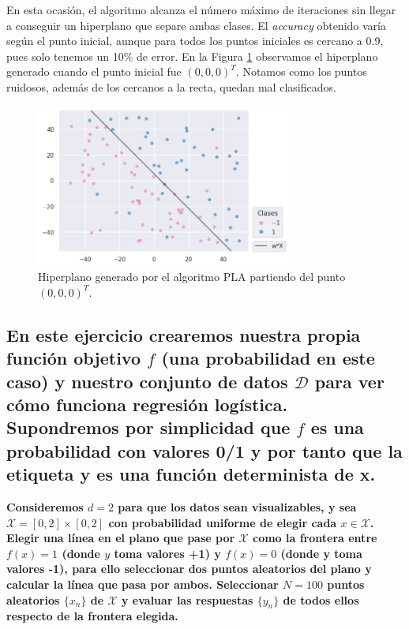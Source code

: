 \documentclass[a4paper, 20pt]{article}
\begin{document}
En esta ocasión, el algoritmo alcanza el número máximo de iteraciones sin llegar a conseguir un hiperplano que separe ambas clases. El \textit{accuracy} obtenido varía según el punto inicial, aunque para todos los puntos iniciales es cercano a 0.9, pues solo tenemos un 10\% de error. En la Figura \ref{fig:21ruido} observamos el hiperplano generado cuando el punto inicial fue $(0,0,0)^T$. Notamos como los puntos ruidosos, además de los cercanos a la recta, quedan mal clasificados. 

\begin{figure}[H]
    \centering
    \includegraphics[width=0.75\textwidth]{21ruido}
    \caption{Hiperplano generado por el algoritmo PLA partiendo del punto $(0,0,0)^T$.}
    \label{fig:21ruido}
\end{figure}

\subsection{En este ejercicio crearemos nuestra propia función objetivo $f$ (una probabilidad en este caso) y nuestro conjunto de datos $\mathcal{D}$ para ver cómo funciona regresión logística. Supondremos por simplicidad que $f$ es una probabilidad con valores 0/1 y por tanto que la etiqueta y es una función determinista de x.}

\textbf{Consideremos $d = 2$ para que los datos sean visualizables, y sea $\mathcal{X} = [0, 2] \times [0, 2]$ con probabilidad uniforme de elegir cada $x \in \mathcal{X}$. Elegir una línea en el plano que pase por $\mathcal{X}$ como la frontera entre $f (x) = 1$ (donde $y$ toma valores +1) y $f (x) = 0$ (donde y toma valores -1), para ello seleccionar dos puntos aleatorios del plano y calcular la línea que pasa por ambos. Seleccionar $N = 100$ puntos aleatorios $\{x_n\}$ de $\mathcal{X}$ y evaluar las respuestas $\{y_n\}$ de todos ellos respecto de la frontera elegida.}
\end{document}
